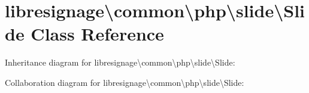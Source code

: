 \hypertarget{classlibresignage_1_1common_1_1php_1_1slide_1_1Slide}{}\section{libresignage\textbackslash{}common\textbackslash{}php\textbackslash{}slide\textbackslash{}Slide Class Reference}
\label{classlibresignage_1_1common_1_1php_1_1slide_1_1Slide}


Inheritance diagram for libresignage\textbackslash{}common\textbackslash{}php\textbackslash{}slide\textbackslash{}Slide\+:


Collaboration diagram for libresignage\textbackslash{}common\textbackslash{}php\textbackslash{}slide\textbackslash{}Slide\+:
